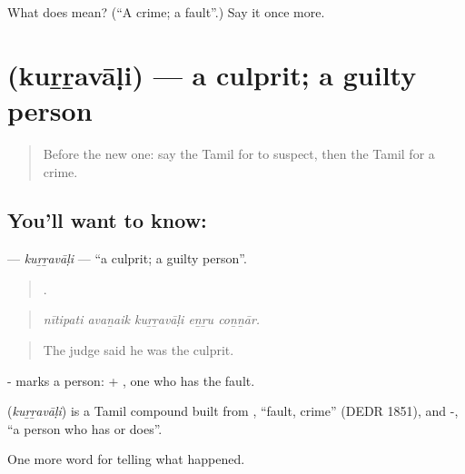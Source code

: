 \begin{tcolorbox}[breakable,colback=teal!4,colframe=teal!35!black,title={Before you move on}]
What does  mean? (\textquotedblleft{}A crime; a fault\textquotedblright{}.) Say it once more.
\end{tcolorbox}
\section[\texorpdfstring{\ta{குற்றவாளி} (kuṟṟavāḷi)}{குற்றவாளி (kuṟṟavāḷi)}]{ (kuṟṟavāḷi) — a culprit; a guilty person}

\label{lesson:TA-C295-kurravali}



\begin{quote}
Before the new one: say the Tamil for to suspect, then the Tamil for a crime.
\end{quote}

\subsection*{You'll want to know: }
\textbf{} — \emph{kuṟṟavāḷi} — \textquotedblleft{}a culprit; a guilty person\textquotedblright{}.

\begin{quote}
    .
\end{quote}

\begin{quote}
\emph{nītipati avaṉaik kuṟṟavāḷi eṉṟu coṉṉār.}
\end{quote}

\begin{quote}
The judge said he was the culprit.
\end{quote}

- marks a person:  + , one who has the fault.

\begin{cousinweb}
\textbf{} (\emph{kuṟṟavāḷi}) is a Tamil compound built from , \textquotedblleft{}fault, crime\textquotedblright{} (DEDR 1851), and -, \textquotedblleft{}a person who has or does\textquotedblright{}.
\end{cousinweb}

\begin{grammarlens}[title={What you've built}]
One more word for telling what happened.
\end{grammarlens}

